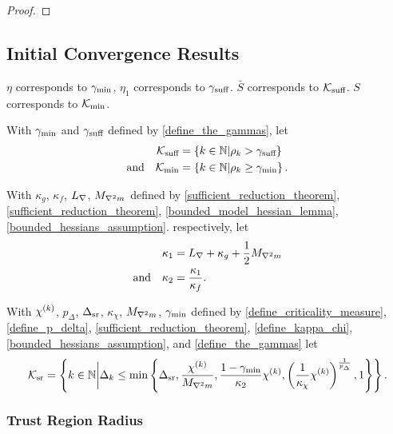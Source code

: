 \begin{proof}
\end{proof}



\subsection{Initial Convergence Results}
\label{initial_convergence_results}
\begin{boxedcomment}
$\eta$ corresponds to $\gamma_{\textrm{min}}$, $\eta_1$ corresponds to $\gamma_{\textrm{suff}}$.
$\bar S$ corresponds to ${\mathcal K_{\textrm{suff}}}$.
$S$ corresponds to ${\mathcal K_{\textrm{min}}}$.
\end{boxedcomment}


With 
$\gamma_{\textrm{min}}$ and $\gamma_{\textrm{suff}}$
defined by \cref{define_the_gammas},
let
\begin{align}
{\mathcal K_{\textrm{suff}}} &= \left\{k \in \mathbb N | \rho_k > \gamma_{\textrm{suff}} \right\} \label{define_suffiterates} \\
\textrm{and} \quad {\mathcal K_{\textrm{min}}} &= \left\{k \in \mathbb N | \rho_k \ge \gamma_{\textrm{min}} \right\} \label{define_miniterates}.
\end{align}

With
$\kappa_g$, $\kappa_f$, ${L_{\nabla}}$, ${M_{\nabla^2 m}}$
defined by
\cref{sufficient_reduction_theorem}, \cref{sufficient_reduction_theorem}, \cref{bounded_model_hessian_lemma}, \cref{bounded_hessians_assumption}.
respectively, let
\begin{align}
{\kappa_1} &= {L_{\nabla}} + \kappa_{g} + \frac 1 2 {M_{\nabla^2 m}} \label{define_theircnot} \\
\textrm{and} \quad {\kappa_2} &= \frac{{\kappa_1}}{\kappa_f} .  \label{define_theirc}
\end{align}

With
${\chi^{(k)}}$, $p_{\Delta}$, ${\Delta_{\textrm{sr}}}$, $\kappa_{\chi}$, ${M_{\nabla^2 m}}$, $\gamma_{\textrm{min}}$
defined by 
\cref{define_criticality_measure}, \cref{define_p_delta}, \cref{sufficient_reduction_theorem}, \cref{define_kappa_chi}, \cref{bounded_hessians_assumption}, and \cref{define_the_gammas}
let
\begin{align}
\label{define_reduceiterates}
{\mathcal K_{\textrm{sr}}} = \left \{ k \in \mathbb N \bigg| \Delta_k \le \min \left\{ 
{\Delta_{\textrm{sr}}}, 
\frac {{\chi^{(k)}}}{{M_{\nabla^2 m}}}, 
\frac{1-\gamma_{\textrm{min}}}{{\kappa_2}}{\chi^{(k)}},
\left(\frac 1 {\kappa_{\chi}}  {\chi^{(k)}}\right)^{\frac 1 {p_{\Delta}}}, 
1
\right\} \right \}.
\end{align}

\subsubsection{Trust Region Radius}


